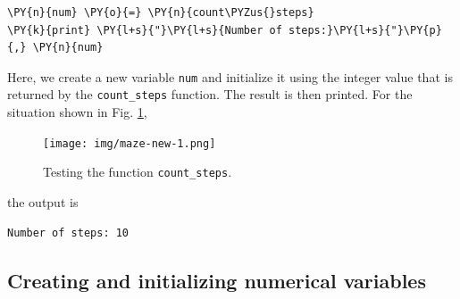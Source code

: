 \begin{bbox}
\begin{Verbatim}[commandchars=\\\{\}]
\PY{n}{num} \PY{o}{=} \PY{n}{count\PYZus{}steps}
\PY{k}{print} \PY{l+s}{"}\PY{l+s}{Number of steps:}\PY{l+s}{"}\PY{p}{,} \PY{n}{num} 
\end{Verbatim}
\end{bbox}
\vspace{6mm}

\noindent
Here, we create a new variable {\tt num} and initialize it using the 
integer value that is returned by the {\tt count\_steps} function.
The result is then printed. For the situation shown in Fig. \ref{fig:cf-1},
\newpage

\begin{figure}[!ht]
\begin{center}
\texttt{[image: img/maze-new-1.png]}
\vspace{-0mm}
\caption{Testing the function {\tt count\_steps}.}
\vspace{-1cm}
\label{fig:cf-1}
\end{center}
\end{figure}

\noindent
the output is\\

\begin{ybox}
\begin{verbatim}
Number of steps: 10
\end{verbatim}
\end{ybox}
\vspace{6mm}
\subsection[\ \ Creating and initializing numerical variables]{Creating and initializing numerical variables} \label{par:var}

